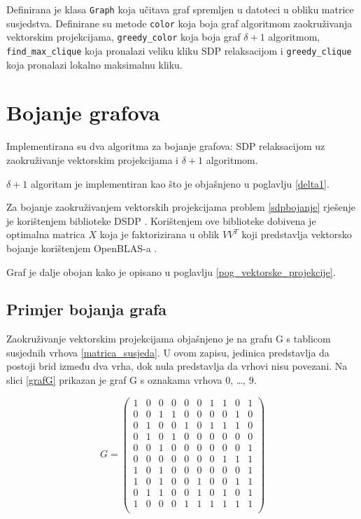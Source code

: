 \documentclass[diplomskirad]{fer}
\begin{document}
Definirana je klasa \verb|Graph| koja učitava graf spremljen u datoteci u obliku matrice susjedstva. Definirane su metode \verb|color| koja boja graf
algoritmom zaokruživanja vektorskim projekcijama, \verb|greedy_color| koja boja graf $\delta + 1$ algoritmom, \verb|find_max_clique| koja
pronalazi veliku kliku SDP relaksacijom i \verb|greedy_clique| koja pronalazi lokalno maksimalnu kliku.

\section{Bojanje grafova}
Implementirana su dva algoritma za bojanje grafova: SDP relaksacijom uz zaokruživanje vektorskim projekcijama i $\delta + 1$ algoritmom.

$\delta + 1$ algoritam je implementiran kao što je objašnjeno u poglavlju \ref{delta1}.

Za bojanje zaokruživanjem vektorskih projekcijama problem \ref{sdpbojanje} rješenje je korištenjem biblioteke DSDP \cite{dsdp-user-guide}.
Korištenjem ove biblioteke dobivena je optimalna matrica $X$ koja je faktorizirana u oblik $VV^T$ koji predstavlja vektorsko bojanje korištenjem
OpenBLAS-a \cite{openBLAS}.

Graf je dalje obojan kako je opisano u poglavlju \ref{pog_vektorske_projekcije}.

\subsection{Primjer bojanja grafa}
Zaokruživanje vektorskim projekcijama objašnjeno je na grafu G s tablicom susjednih vrhova \ref{matrica_susjeda}. U ovom zapisu,
jedinica predstavlja da postoji brid između dva vrha, dok nula predstavlja da vrhovi nisu povezani.
Na slici \ref{grafG} prikazan je graf G s oznakama vrhova
0, \dots, 9.

\begin{equation} \label{matrica_susjeda}
   G =\begin{pmatrix}
    1 & 0 & 0 & 0 & 0 & 0 & 1 & 1 & 0 & 1 \\
    0 & 0 & 1 & 1 & 0 & 0 & 0 & 0 & 1 & 0 \\
    0 & 1 & 0 & 0 & 1 & 0 & 1 & 1 & 1 & 0 \\
    0 & 1 & 0 & 1 & 0 & 0 & 0 & 0 & 0 & 0 \\
    0 & 0 & 1 & 0 & 0 & 0 & 0 & 0 & 0 & 1 \\
    0 & 0 & 0 & 0 & 0 & 0 & 0 & 1 & 1 & 1 \\
    1 & 0 & 1 & 0 & 0 & 0 & 0 & 0 & 0 & 1 \\
    1 & 0 & 1 & 0 & 0 & 1 & 0 & 0 & 1 & 1 \\
    0 & 1 & 1 & 0 & 0 & 1 & 0 & 1 & 0 & 1 \\
    1 & 0 & 0 & 0 & 1 & 1 & 1 & 1 & 1 & 1 \\
  \end{pmatrix}
\end{equation}
\end{document}
